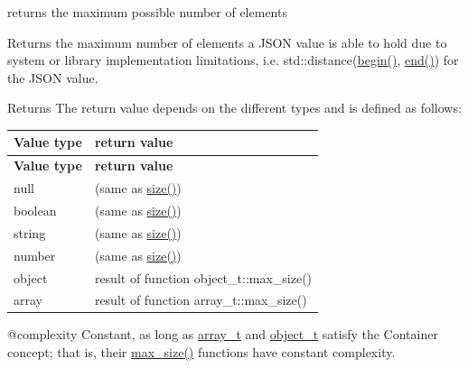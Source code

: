 returns the maximum possible number of elements 

Returns the maximum number of elements a J\+S\+ON value is able to hold due to system or library implementation limitations, i.\+e. {\ttfamily std\+::distance(\mbox{\hyperlink{classnlohmann_1_1basic__json_a0ff28dac23f2bdecee9564d07f51dcdc}{begin()}}, \mbox{\hyperlink{classnlohmann_1_1basic__json_a13e032a02a7fd8a93fdddc2fcbc4763c}{end()}})} for the J\+S\+ON value.

\begin{DoxyReturn}{Returns}
The return value depends on the different types and is defined as follows\+: \tabulinesep=1mm
\begin{longtabu}spread 0pt [c]{*{2}{|X[-1]}|}
\hline
\PBS\centering \cellcolor{\tableheadbgcolor}\textbf{ Value type  }&\PBS\centering \cellcolor{\tableheadbgcolor}\textbf{ return value   }\\
\endfirsthead
\hline
\endfoot
\hline
\PBS\centering \cellcolor{\tableheadbgcolor}\textbf{ Value type  }&\PBS\centering \cellcolor{\tableheadbgcolor}\textbf{ return value   }\\
\endhead
null  &{} (same as {\ttfamily \mbox{\hyperlink{classnlohmann_1_1basic__json_a25e27ad0c6d53c01871c5485e1f75b96}{size()}}})   \\
boolean  &{} (same as {\ttfamily \mbox{\hyperlink{classnlohmann_1_1basic__json_a25e27ad0c6d53c01871c5485e1f75b96}{size()}}})   \\
string  &{} (same as {\ttfamily \mbox{\hyperlink{classnlohmann_1_1basic__json_a25e27ad0c6d53c01871c5485e1f75b96}{size()}}})   \\
number  &{} (same as {\ttfamily \mbox{\hyperlink{classnlohmann_1_1basic__json_a25e27ad0c6d53c01871c5485e1f75b96}{size()}}})   \\
object  &result of function {\ttfamily object\+\_\+t\+::max\+\_\+size()}   \\
array  &result of function {\ttfamily array\+\_\+t\+::max\+\_\+size()}   \\
\end{longtabu}

\end{DoxyReturn}
@complexity Constant, as long as \mbox{\hyperlink{classnlohmann_1_1basic__json_ae095578e03df97c5b3991787f1056374}{array\+\_\+t}} and \mbox{\hyperlink{classnlohmann_1_1basic__json_aa1eb13d5aa86f80cbee6c58e90fbaf49}{object\+\_\+t}} satisfy the Container concept; that is, their {\ttfamily \mbox{\hyperlink{classnlohmann_1_1basic__json_a2f47d3c6a441c57dd2be00449fbb88e1}{max\+\_\+size()}}} functions have constant complexity.


